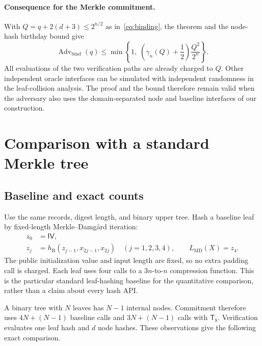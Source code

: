 \documentclass[11pt,letterpaper]{article}
\theoremstyle{definition} %
\newcommand{\Tate}{\mathsf{T}_{8}}
\newcommand{\mtadv}{\operatorname{Adv}}
\begin{document}
\paragraph{Consequence for the Merkle commitment.}
With $Q=q+2(d+3)\leq2^{n/2}$ as in~\eqref{eq:binding}, the theorem
and the node-hash birthday bound give
\begin{equation}
 \mtadv_{\mathrm{bind}}(q)
 \leq\min\left\{1,\;
 \left(\gamma_n(Q)+\frac12\right)\frac{Q^2}{2^n}\right\}.
 \label{eq:refined-binding}
\end{equation}
All evaluations of the two verification paths are already charged to
$Q$. Other independent oracle interfaces can be simulated with
independent randomness in the
leaf-collision analysis. The proof and the bound therefore remain valid
when the adversary also uses the domain-separated node and baseline
interfaces of our construction.

\section{Comparison with a standard Merkle tree}
\label{sec:cost}
\subsection{Baseline and exact counts}
Use the same records, digest length, and binary upper tree. Hash a baseline
leaf by fixed-length Merkle--Damg\aa rd iteration:
\begin{equation}
\begin{aligned}
 z_0&=\mathsf{IV},\\
 z_j&=h_{\mathrm B}(z_{j-1},x_{2j-1},x_{2j})
      \quad(j=1,2,3,4),\qquad L_{\mathrm{MD}}(X)=z_4.
\end{aligned}
\label{eq:baseline}
\end{equation}
The public initialization value and input length are fixed, so no extra
padding call is charged. Each leaf uses four calls to a $3n$-to-$n$
compression function. This is the particular standard leaf-hashing baseline
for the quantitative comparison, rather than a claim about every hash API.

A binary tree with $N$ leaves has $N-1$ internal nodes. Commitment therefore
uses $4N+(N-1)$ baseline calls and $3N+(N-1)$ calls with $\Tate$.
Verification evaluates one leaf hash and $d$ node hashes. These observations
give the following exact comparison.
\end{document}
